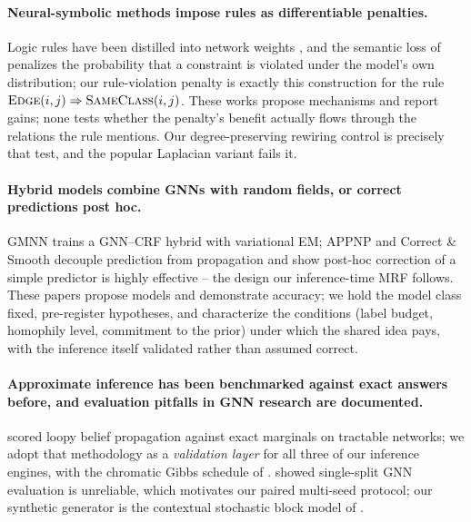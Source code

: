 \documentclass{article}
\begin{document}
\paragraph{Neural-symbolic methods impose rules as differentiable penalties.} Logic rules have
been distilled into network weights \citep{hu2016harnessing}, and the semantic loss of
\citet{xu2018semantic} penalizes the probability that a constraint is violated under the model's
own distribution; our rule-violation penalty is exactly this construction for the rule
$\textsc{Edge}(i,j)\Rightarrow\textsc{SameClass}(i,j)$. These works propose mechanisms and
report gains; none tests whether the penalty's benefit actually flows through the relations the
rule mentions. Our degree-preserving rewiring control is precisely that test, and the popular
Laplacian variant fails it.

\paragraph{Hybrid models combine GNNs with random fields, or correct predictions post hoc.}
GMNN \citep{qu2019gmnn} trains a GNN--CRF hybrid with variational EM; APPNP
\citep{gasteiger2019predict} and Correct \& Smooth \citep{huang2021combining} decouple
prediction from propagation and show post-hoc correction of a simple predictor is highly
effective -- the design our inference-time MRF follows. These papers propose models and
demonstrate accuracy; we hold the model class fixed, pre-register hypotheses, and characterize
the conditions (label budget, homophily level, commitment to the prior) under which the shared
idea pays, with the inference itself validated rather than assumed correct.

\paragraph{Approximate inference has been benchmarked against exact answers before, and
evaluation pitfalls in GNN research are documented.} \citet{murphy1999loopy} scored loopy belief
propagation against exact marginals on tractable networks; we adopt that methodology as a
\emph{validation layer} for all three of our inference engines, with the chromatic Gibbs
schedule of \citet{gonzalez2011parallel}. \citet{shchur2018pitfalls} showed single-split GNN
evaluation is unreliable, which motivates our paired multi-seed protocol; our synthetic
generator is the contextual stochastic block model of \citet{deshpande2018contextual}.
\end{document}
